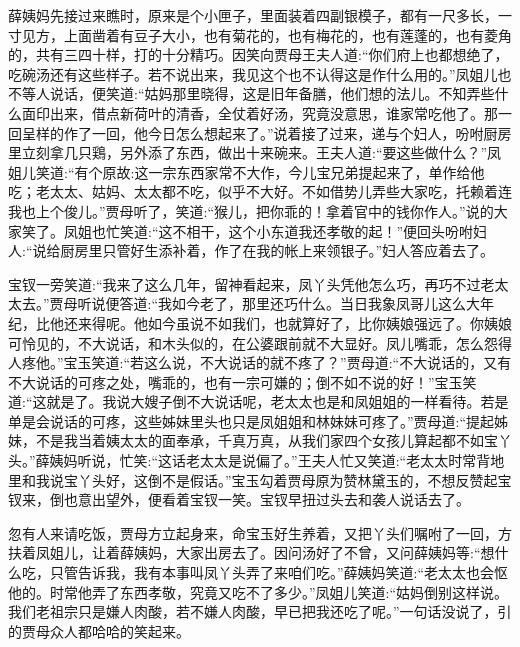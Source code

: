 \begin{parag}
    薛姨妈先接过来瞧时，原来是个小匣子，里面装着四副银模子，都有一尺多长，一寸见方，上面凿着有豆子大小，也有菊花的，也有梅花的，也有莲蓬的，也有菱角的，共有三四十样，打的十分精巧。因笑向贾母王夫人道:“你们府上也都想绝了，吃碗汤还有这些样子。若不说出来，我见这个也不认得这是作什么用的。”凤姐儿也不等人说话，便笑道:“姑妈那里晓得，这是旧年备膳，他们想的法儿。不知弄些什么面印出来，借点新荷叶的清香，全仗着好汤，究竟没意思，谁家常吃他了。那一回呈样的作了一回，他今日怎么想起来了。”说着接了过来，递与个妇人，吩咐厨房里立刻拿几只鶏，另外添了东西，做出十来碗来。王夫人道:“要这些做什么？”凤姐儿笑道:“有个原故:这一宗东西家常不大作，今儿宝兄弟提起来了，单作给他吃；老太太、姑妈、太太都不吃，似乎不大好。不如借势儿弄些大家吃，托赖着连我也上个俊儿。”贾母听了，笑道:“猴儿，把你乖的！拿着官中的钱你作人。”说的大家笑了。凤姐也忙笑道:“这不相干，这个小东道我还孝敬的起！”便回头吩咐妇人:“说给厨房里只管好生添补着，作了在我的帐上来领银子。”妇人答应着去了。
\end{parag}


\begin{parag}
    宝钗一旁笑道:“我来了这么几年，留神看起来，凤丫头凭他怎么巧，再巧不过老太太去。”贾母听说便答道:“我如今老了，那里还巧什么。当日我象凤哥儿这么大年纪，比他还来得呢。他如今虽说不如我们，也就算好了，比你姨娘强远了。你姨娘可怜见的，不大说话，和木头似的，在公婆跟前就不大显好。凤儿嘴乖，怎么怨得人疼他。”宝玉笑道:“若这么说，不大说话的就不疼了？”贾母道:“不大说话的，又有不大说话的可疼之处，嘴乖的，也有一宗可嫌的；倒不如不说的好！”宝玉笑道:“这就是了。我说大嫂子倒不大说话呢，老太太也是和凤姐姐的一样看待。若是单是会说话的可疼，这些姊妹里头也只是凤姐姐和林妹妹可疼了。”贾母道:“提起姊妹，不是我当着姨太太的面奉承，千真万真，从我们家四个女孩儿算起都不如宝丫头。”薛姨妈听说，忙笑:“这话老太太是说偏了。”王夫人忙又笑道:“老太太时常背地里和我说宝丫头好，这倒不是假话。”宝玉勾着贾母原为赞林黛玉的，不想反赞起宝钗来，倒也意出望外，便看着宝钗一笑。宝钗早扭过头去和袭人说话去了。
\end{parag}


\begin{parag}
    忽有人来请吃饭，贾母方立起身来，命宝玉好生养着，又把丫头们嘱咐了一回，方扶着凤姐儿，让着薛姨妈，大家出房去了。因问汤好了不曾，又问薛姨妈等:“想什么吃，只管告诉我，我有本事叫凤丫头弄了来咱们吃。”薛姨妈笑道:“老太太也会怄他的。时常他弄了东西孝敬，究竟又吃不了多少。”凤姐儿笑道:“姑妈倒别这样说。我们老祖宗只是嫌人肉酸，若不嫌人肉酸，早已把我还吃了呢。”一句话没说了，引的贾母众人都哈哈的笑起来。
\end{parag}


